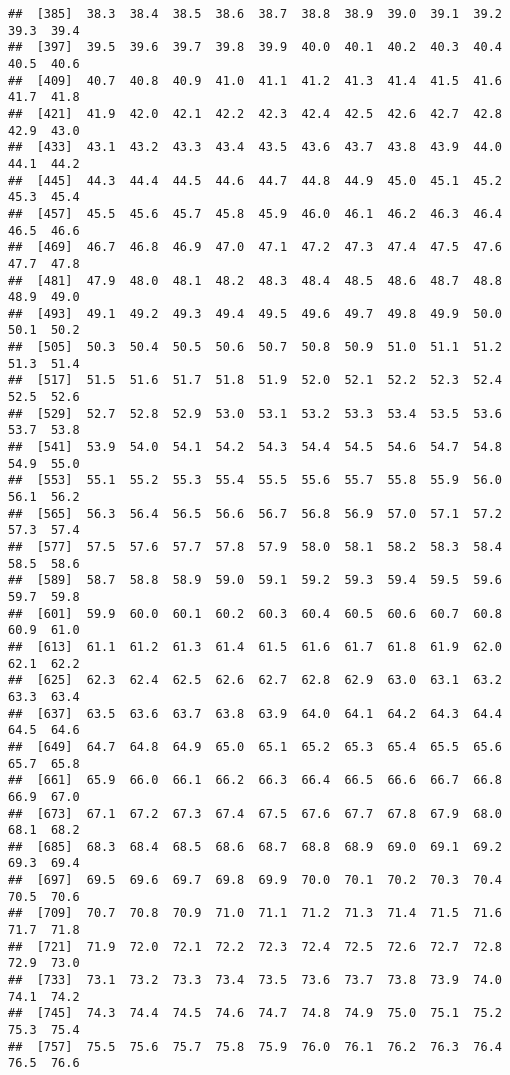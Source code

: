 \documentclass[
]{article}
\begin{document}
\begin{verbatim}
##  [385]  38.3  38.4  38.5  38.6  38.7  38.8  38.9  39.0  39.1  39.2  39.3  39.4
##  [397]  39.5  39.6  39.7  39.8  39.9  40.0  40.1  40.2  40.3  40.4  40.5  40.6
##  [409]  40.7  40.8  40.9  41.0  41.1  41.2  41.3  41.4  41.5  41.6  41.7  41.8
##  [421]  41.9  42.0  42.1  42.2  42.3  42.4  42.5  42.6  42.7  42.8  42.9  43.0
##  [433]  43.1  43.2  43.3  43.4  43.5  43.6  43.7  43.8  43.9  44.0  44.1  44.2
##  [445]  44.3  44.4  44.5  44.6  44.7  44.8  44.9  45.0  45.1  45.2  45.3  45.4
##  [457]  45.5  45.6  45.7  45.8  45.9  46.0  46.1  46.2  46.3  46.4  46.5  46.6
##  [469]  46.7  46.8  46.9  47.0  47.1  47.2  47.3  47.4  47.5  47.6  47.7  47.8
##  [481]  47.9  48.0  48.1  48.2  48.3  48.4  48.5  48.6  48.7  48.8  48.9  49.0
##  [493]  49.1  49.2  49.3  49.4  49.5  49.6  49.7  49.8  49.9  50.0  50.1  50.2
##  [505]  50.3  50.4  50.5  50.6  50.7  50.8  50.9  51.0  51.1  51.2  51.3  51.4
##  [517]  51.5  51.6  51.7  51.8  51.9  52.0  52.1  52.2  52.3  52.4  52.5  52.6
##  [529]  52.7  52.8  52.9  53.0  53.1  53.2  53.3  53.4  53.5  53.6  53.7  53.8
##  [541]  53.9  54.0  54.1  54.2  54.3  54.4  54.5  54.6  54.7  54.8  54.9  55.0
##  [553]  55.1  55.2  55.3  55.4  55.5  55.6  55.7  55.8  55.9  56.0  56.1  56.2
##  [565]  56.3  56.4  56.5  56.6  56.7  56.8  56.9  57.0  57.1  57.2  57.3  57.4
##  [577]  57.5  57.6  57.7  57.8  57.9  58.0  58.1  58.2  58.3  58.4  58.5  58.6
##  [589]  58.7  58.8  58.9  59.0  59.1  59.2  59.3  59.4  59.5  59.6  59.7  59.8
##  [601]  59.9  60.0  60.1  60.2  60.3  60.4  60.5  60.6  60.7  60.8  60.9  61.0
##  [613]  61.1  61.2  61.3  61.4  61.5  61.6  61.7  61.8  61.9  62.0  62.1  62.2
##  [625]  62.3  62.4  62.5  62.6  62.7  62.8  62.9  63.0  63.1  63.2  63.3  63.4
##  [637]  63.5  63.6  63.7  63.8  63.9  64.0  64.1  64.2  64.3  64.4  64.5  64.6
##  [649]  64.7  64.8  64.9  65.0  65.1  65.2  65.3  65.4  65.5  65.6  65.7  65.8
##  [661]  65.9  66.0  66.1  66.2  66.3  66.4  66.5  66.6  66.7  66.8  66.9  67.0
##  [673]  67.1  67.2  67.3  67.4  67.5  67.6  67.7  67.8  67.9  68.0  68.1  68.2
##  [685]  68.3  68.4  68.5  68.6  68.7  68.8  68.9  69.0  69.1  69.2  69.3  69.4
##  [697]  69.5  69.6  69.7  69.8  69.9  70.0  70.1  70.2  70.3  70.4  70.5  70.6
##  [709]  70.7  70.8  70.9  71.0  71.1  71.2  71.3  71.4  71.5  71.6  71.7  71.8
##  [721]  71.9  72.0  72.1  72.2  72.3  72.4  72.5  72.6  72.7  72.8  72.9  73.0
##  [733]  73.1  73.2  73.3  73.4  73.5  73.6  73.7  73.8  73.9  74.0  74.1  74.2
##  [745]  74.3  74.4  74.5  74.6  74.7  74.8  74.9  75.0  75.1  75.2  75.3  75.4
##  [757]  75.5  75.6  75.7  75.8  75.9  76.0  76.1  76.2  76.3  76.4  76.5  76.6

\end{verbatim}
\end{document}
